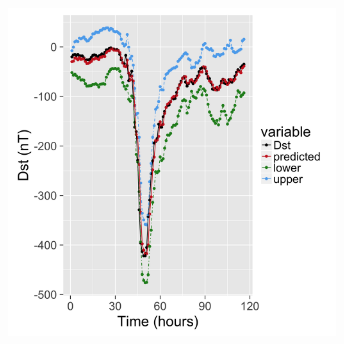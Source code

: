 \documentclass[a4paper]{article}            %
\begin{document}
\begin{slidetop}
    \begin{center}
        \includegraphics[width=0.65\textwidth]{PredErrBars_Storm46.png}%
    \end{center}
    
    
\end{slidetop}
\end{document}
